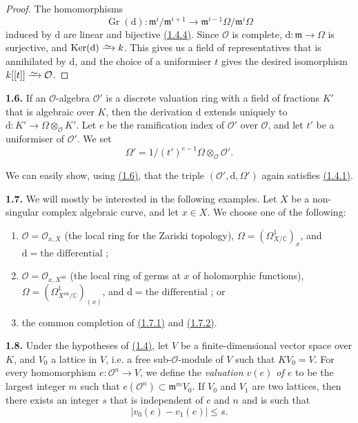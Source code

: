 \documentclass{report}
\newenvironment{rmenv}[1]
  {\phantomsection\par\medskip\noindent\textbf{#1.}\rmfamily}
  {\par\medskip}
\renewcommand{\cal}[1]{{\mathcal{#1}}}
\newcommand{\fk}[1]{{\mathfrak{#1}}}
\newcommand{\CC}{\mathbb{C}}
\newcommand{\dd}{\mathrm{d}}
\newcommand{\an}{\mathrm{an}}
\newcommand{\simto}{\xrightarrow{\raisebox{-0.7ex}[0ex][0ex]{$\sim$}}}
\renewcommand{\leq}{\leqslant}
\DeclareMathOperator{\Ker}{Ker}
\DeclareMathOperator{\Gr}{Gr}
\newcommand{\oldpage}[1]{\marginpar{\footnotesize$\Big\vert$ \textit{p.~#1}}}
\begin{document}
\begin{proof}
  The homomorphisms
  \[
    \Gr(\dd)\colon \fk{m}^i/\fk{m}^{i+1} \to \fk{m}^{i-1}\Omega/\fk{m}^i\Omega
  \]
  induced by $\dd$ are linear and bijective \hyperref[II.1.4.4]{(1.4.4)}.
  Since $\cal{O}$ is complete, $\dd\colon\fk{m}\to\Omega$ is surjective, and $\Ker(\dd)\simto k$.
  This gives us a field of representatives that is annihilated by $\dd$, and the choice of a uniformiser $t$ gives the desired isomorphism $k[[t]]\simto\cal{O}$.
\end{proof}

\begin{rmenv}{1.6}
\label{II.1.6}
  If an $\cal{O}$-algebra $\cal{O}'$ is a discrete valuation ring with a field of fractions $K'$ that is algebraic over $K$, then the derivation $\dd$ extends uniquely to $\dd\colon K'\to\Omega\otimes_{\cal{O}}K'$.
  Let $e$ be the ramification index of $\cal{O}'$ over $\cal{O}$, and let $t'$ be a uniformiser of $\cal{O}'$.
  We set
  \[
    \Omega' = 1/(t')^{e-1}\Omega\otimes_{\cal{O}}\cal{O}'.
  \]
\end{rmenv}

We can easily show, using \hyperref[II.1.6]{(1.6)}, that the triple $(\cal{O}',\dd,\Omega')$ again satisfies \hyperref[II.1.4.1]{(1.4.1)}.

\begin{rmenv}{1.7}
  We will mostly be interested in the following examples.
  Let $X$ be a non-singular complex algebraic curve, and let $x\in X$.
  We choose one of the following:
  \begin{enumerate}
    \item[(1.7.1)]\label{II.1.7.1}
      $\cal{O}=\cal{O}_{x,X}$ (the local ring for the Zariski topology), $\Omega=(\Omega_{X/\CC}^1)_x$, and $\dd=\mbox{the differential}$ ;
    \item[(1.7.2)]\label{II.1.7.2}
      $\cal{O}=\cal{O}_{x,X^\an}$ (the local ring of germs at $x$ of holomorphic functions), $\Omega=(\Omega_{X^\an/\CC}^1)_{(x)}$, and $\dd=\mbox{the differential}$ ; or
    \item[(1.7.3)]\label{II.1.7.3}
      the common completion of \hyperref[II.1.7.1]{(1.7.1)} and \hyperref[II.1.7.2]{(1.7.2)}.
  \end{enumerate}
\end{rmenv}

\oldpage{45}
\begin{rmenv}{1.8}
\label{II.1.8}
  Under the hypotheses of \hyperref[II.1.4]{(1.4)}, let $V$ be a finite-dimensional vector space over $K$, and $V_0$ a lattice in $V$, i.e. a free sub-$\cal{O}$-module of $V$ such that $KV_0=V$.
  For every homomorphism $e\colon\cal{O}^n\to V$, we define the \emph{valuation $v(e)$ of $e$} to be the largest integer $m$ such that $e(\cal{O}^n)\subset\fk{m}^m V_0$.
  If $V_0$ and $V_1$ are two lattices, then there exists an integer $s$ that is independent of $e$ and $n$ and is such that
  \[
  \label{II.1.8.1}
    |v_0(e) - v_1(e)| \leq s.
  \tag{1.8.1}
  \]
\end{rmenv}
\end{document}
